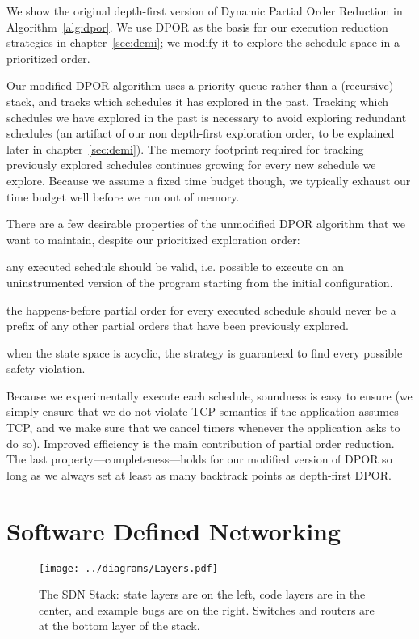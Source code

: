 We show the original depth-first version of Dynamic Partial Order Reduction
in Algorithm~\ref{alg:dpor}. We use DPOR as the basis for our execution
reduction strategies in chapter~\ref{sec:demi}; we modify it to explore the
schedule space in a
prioritized order.

Our modified DPOR algorithm uses a priority queue
rather than a (recursive) stack, and tracks which schedules it has explored
in the past. Tracking which schedules we have explored in the past is
necessary to avoid exploring redundant schedules (an artifact of our non depth-first
exploration order, to be explained later in chapter~\ref{sec:demi}). The memory footprint required for tracking previously explored
schedules continues growing for every new schedule we explore. Because we
assume a fixed time budget though,
we typically exhaust our time budget well before we run out of memory.

There are a few desirable properties of the unmodified DPOR algorithm that we want to maintain,
despite our prioritized exploration order:

 any executed schedule should be valid, i.e. possible
to execute on an uninstrumented version of the program starting from the
initial configuration.

 the happens-before partial order for every executed schedule
should never be a prefix of any other partial orders that have been
previously explored.

 when the state space is acyclic, the strategy is guaranteed to
find every possible safety violation.

Because we experimentally execute each schedule, soundness is easy to
ensure (we simply ensure that we do not violate TCP semantics if the application
assumes TCP, and we make sure that
we cancel timers whenever the application asks to do so).
Improved efficiency is the main contribution of partial order reduction. The last
property---completeness---holds for our modified version of DPOR so long as we
always set at least as many backtrack points as depth-first
DPOR.


\section{Software Defined Networking}
\label{sec:sdn}

\begin{figure}[ht!]
\centering
\texttt{[image: ../diagrams/Layers.pdf]}
\caption{The SDN Stack: state layers are on the left, code layers are in the
center, and example bugs are on the right. Switches and routers are at the
bottom layer of the stack.}
\label{fig:layers}
\end{figure}

